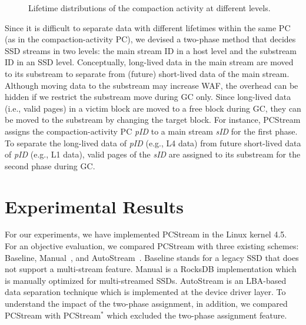 \begin{figure}[!t]
	\hspace{10pt}
\caption{Lifetime distributions of the compaction activity at different levels.} %
\label{fig:compaction}
\end{figure}

Since it is difficult to separate data with different lifetimes within the same PC 
(as in the compaction-activity PC), we devised a two-phase method that decides SSD 
streams in two levels: the main stream ID in a host level and the substream ID in an SSD level.
Conceptually, long-lived data in the main stream are moved to its substream to 
separate from (future) short-lived data of the main stream.
Although moving data to the substream may increase WAF,
the overhead can be hidden if we restrict the substream move during GC only.
Since long-lived data (i.e., valid pages) in a victim block are moved to a free block during GC, 
they can be moved to the substream by changing the target block.
For instance, \textsf{\small PCStream} assigns the compaction-activity PC {\it pID} to a
main stream {\it sID} for the first phase.
To separate the long-lived data of {\it pID} (e.g., L4 data) 
from future short-lived data of {\it pID} (e.g., L1 data), 
valid pages of the {\it sID} are assigned to its substream for the second phase during GC.


\section{Experimental Results}

For our experiments, we have implemented \textsf{\small PCStream} in the Linux kernel
4.5.  For an objective evaluation, we compared \textsf{\small PCStream} with three
existing schemes: \textsf{\small Baseline}, \textsf{\small Manual}~\cite{MultiStream}, and
\textsf{\small AutoStream}~\cite{AutoStream}.  \textsf{\small Baseline} stands for a legacy
SSD that does not support a multi-stream feature. \textsf{\small Manual} is a RocksDB
implementation which is manually optimized for multi-streamed SSDs.
\textsf{\small AutoStream} is an LBA-based data separation technique which is
implemented at the device driver layer. To understand the impact of the
two-phase assignment, in addition, we compared \textsf{\small PCStream} with
\textsf{\small PCStream$^{*}$} which excluded the two-phase assignment feature.

